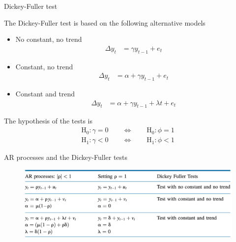 \documentclass[10pt,aspectratio=169]{beamer}  %
\begin{document}

\begin{frame}{Dickey-Fuller test}

    \bigskip
    The Dickey-Fuller test is based on the following alternative models
    \begin{itemize}
        \item No constant, no trend
              \begin{align*}
                  \Delta y_{t} & = \gamma y_{t-1} + e_{t}
              \end{align*}
        \item Constant, no trend
              \begin{align*}
                  \Delta y_{t} & = \alpha + \gamma y_{t-1} + e_{t}
              \end{align*}
        \item Constant and trend
              \begin{align*}
                  \Delta y_{t} & = \alpha + \gamma y_{t-1} + \lambda t + e_{t}
              \end{align*}
    \end{itemize}

    The hypothesis of the tests is
    \begin{align*}
        \mathrm{H}_0: \gamma = 0 \qquad \Longleftrightarrow \qquad \mathrm{H}_0: \phi = 1 \\
        \mathrm{H}_1: \gamma < 0 \qquad \Longleftrightarrow \qquad \mathrm{H}_1: \phi < 1
    \end{align*}

\end{frame}


\begin{frame}{AR processes and the Dickey-Fuller tests}

    \bigskip
    \begin{figure}[H]
        \centering
        \includegraphics[height=0.3\textwidth]{./fig/dickey-fuller-hypotheses.png}
    \end{figure}

\end{frame}
\end{document}
